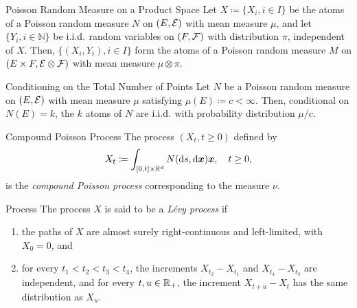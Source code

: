 \begin{prop}{Poisson Random Measure on a Product Space}{}
	Let $X \coloneqq \{X_i, i \in I\}$ be the atoms of a Poisson random measure $N$ on $(E, \mathcal{E})$ with mean measure $\mu$, and let $\{Y_i, i \in \mathbb{N}\}$ be $\text{i.i.d.}$ random variables on $(F, \mathcal{F})$ with distribution $\pi$, independent of $X$. Then, $\{(X_i, Y_i), i \in I\}$ form the atoms of a Poisson random measure $M$ on $(E \times F, \mathcal{E} \otimes \mathcal{F})$ with mean measure $\mu \otimes \pi$.
\end{prop}

\begin{thm}{Conditioning on the Total Number of Points}{}
	Let $N$ be a Poisson random measure on $(E, \mathcal{E})$ with mean measure $\mu$ satisfying $\mu(E) \coloneqq c < \infty$. Then, conditional on $N(E) = k$, the $k$ atoms of $N$ are $\text{i.i.d.}$ with probability distribution $\mu/c$.
\end{thm}

\begin{defn}{Compound Poisson Process}{}
	The process $(X_t, t \ge 0)$ defined by
	\begin{equation*}
		X_t \coloneqq \int_{[0, t] \times \mathbb{R}^d} N(\mathrm{d} s, \mathrm{d} \boldsymbol{x}) \boldsymbol{x}, \quad t \ge 0,
	\end{equation*}
	is the \textit{compound Poisson process} corresponding to the measure $\nu$.
\end{defn}

\begin{defn}{\Levy \; Process}{}
	The process $X$ is said to be a \textit{Lévy process} if
	\begin{enumerate}
		\item the paths of $X$ are almost surely right-continuous and left-limited, with $X_0 = 0$, and
		\item for every $t_1 < t_2 < t_3 < t_4$, the increments $X_{t_2} - X_{t_1}$ and $X_{t_4} - X_{t_3}$ are independent, and for every $t, u \in \mathbb{R}_+$, the increment $X_{t+u} - X_t$ has the same distribution as $X_u$.
	\end{enumerate}
\end{defn}

